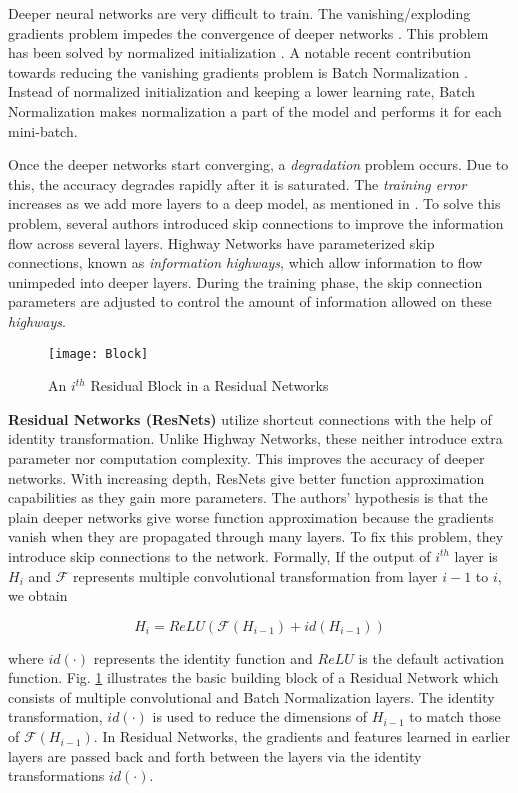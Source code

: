 \documentclass[10pt,twocolumn,letterpaper]{article}
\begin{document}
Deeper neural networks are very difficult to train. The vanishing/exploding gradients problem impedes the convergence of deeper networks \cite{[3]}. This problem has been solved by normalized initialization \cite{[3], [5], [6]}. A notable recent contribution towards reducing the vanishing gradients problem is Batch Normalization \cite{[4]}. Instead of normalized initialization and keeping a lower learning rate, Batch Normalization makes normalization a part of the model and performs it for each mini-batch.

Once the deeper networks start converging, a \emph{degradation} problem occurs. Due to this, the accuracy degrades rapidly after it is saturated. The \emph{training error} increases as we add more layers to a deep model, as mentioned in \cite{[2]}. To solve this problem, several authors introduced skip connections to improve the information flow across several layers. Highway Networks \cite{[7]} have parameterized skip connections, known as \emph{information highways}, which allow information to flow unimpeded into deeper layers. During the training phase, the skip connection parameters are adjusted to control the amount of information allowed on these \emph{highways}.

\begin{figure}
\centering
\texttt{[image: Block]}
\caption{An \( i^{th} \) Residual Block in a Residual Networks}
\label{fig:resblock}
\end{figure}

\textbf{Residual Networks (ResNets)} \cite{[1]} utilize shortcut connections with the help of identity transformation. Unlike Highway Networks, these neither introduce extra parameter nor computation complexity. This improves the accuracy of deeper networks. With increasing depth, ResNets give better function approximation capabilities as they gain more parameters. The authors' hypothesis is that the plain deeper networks give worse function approximation because the gradients vanish when they are propagated through many layers. To fix this problem, they introduce skip connections to the network. Formally, If the output of \( i^{th} \) layer is \( H_i \) and \( \mathcal{F} \) represents multiple convolutional transformation from layer \( i-1 \) to \( i \), we obtain

\begin{equation} \label{eq:1}
 H_i = ReLU( \mathcal{F}(H_{i-1}) + id(H_{i-1} ))
\end{equation}

where \( id(\cdot) \) represents the identity function and \( ReLU \) \cite{[8]} is the default activation function. Fig. \ref{fig:resblock} illustrates the basic building block of a Residual Network which consists of multiple convolutional and Batch Normalization layers. The identity transformation, \( id(\cdot) \) is used to reduce the dimensions of \( H_{i-1} \) to match those of \( \mathcal{F}(H_{i-1}) \). In Residual Networks, the gradients and features learned in earlier layers are passed back and forth between the layers via the identity transformations \( id(\cdot) \).
\end{document}
